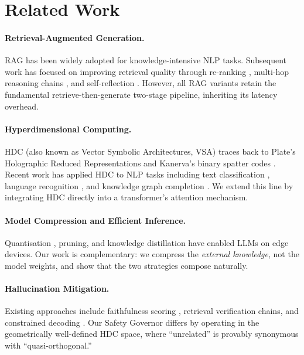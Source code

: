 \documentclass[11pt,a4paper]{article}
\begin{document}
\section{Related Work}
\label{sec:related}

\paragraph{Retrieval-Augmented Generation.}
RAG \citep{lewis2020retrieval} has been widely adopted for knowledge-intensive
NLP tasks.  Subsequent work has focused on improving retrieval quality through
re-ranking \citep{glass2022re2g}, multi-hop reasoning chains
\citep{trivedi2023interleaving}, and self-reflection
\citep{asai2024selfrag}.  However, all RAG variants retain the fundamental
retrieve-then-generate two-stage pipeline, inheriting its latency overhead.

\paragraph{Hyperdimensional Computing.}
HDC (also known as Vector Symbolic Architectures, VSA) traces back to
Plate's Holographic Reduced Representations \citep{plate1995holographic}
and Kanerva's binary spatter codes \citep{kanerva2009hyperdimensional}.
Recent work has applied HDC to NLP tasks including text classification
\citep{imani2019hdctext}, language recognition
\citep{rahimi2017hyperlanguage}, and knowledge graph completion
\citep{kleyko2022hdkg}.  We extend this line by integrating HDC directly
into a transformer's attention mechanism.

\paragraph{Model Compression and Efficient Inference.}
Quantisation \citep{dettmers2023qlora}, pruning, and knowledge distillation
have enabled LLMs on edge devices.  Our work is complementary: we compress
the \emph{external knowledge}, not the model weights, and show that the
two strategies compose naturally.

\paragraph{Hallucination Mitigation.}
Existing approaches include faithfulness scoring
\citep{manakul2023selfcheckgpt}, retrieval verification chains, and
constrained decoding \citep{lu2022neurologic}.  Our Safety Governor differs
by operating in the geometrically well-defined HDC space, where ``unrelated''
is provably synonymous with ``quasi-orthogonal.''
\end{document}
